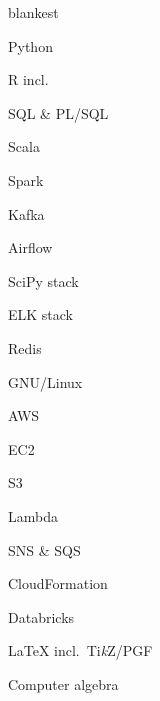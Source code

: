 \documentclass[%
version=last,%
fontsize=11pt,%
paper=A4,%
areasetadvanced,%
headinclude=false,%
footinclude=false,%
headlines=0,%
footlines=0,%
toc=bibnumbered,%
]{scrartcl}
\begin{document}
\begin{minipage}[t]{.4\textwidth}
  \begin{UniformTCBRaster}{2}
    \begin{tcboxedraster}[raster columns=1]{blankest}
      \begin{TCBUnlabeledItems}
      \item Python
      \item R incl.\ 
      \item SQL \& PL/SQL
      \item Scala
      \end{TCBUnlabeledItems}
      \begin{tcolorbox}
        \begin{minipage}[t]{.5\linewidth}
          \begin{UnlabeledItems}
          \item Spark
          \item Kafka
          \item Airflow
          \end{UnlabeledItems}
        \end{minipage}%
        \hfill%
        \begin{minipage}[t]{.5\linewidth}
          \begin{UnlabeledItems}
          \item SciPy stack
          \item ELK stack
          \item Redis
          \end{UnlabeledItems}
        \end{minipage}
      \end{tcolorbox}
    \end{tcboxedraster}
    \begin{TCBUnlabeledItems}
    \item GNU/Linux
    \item AWS
      \begin{Items}[labelindent=10pt,labelsep=3pt,leftmargin=*]
      \item EC2
      \item S3
      \item Lambda
      \item SNS \& SQS
      \item CloudFormation
      \end{Items}
    \item Databricks
    \end{TCBUnlabeledItems}
    \begin{tcolorbox}
      \LaTeX{} incl.\ Ti\emph{k}Z/PGF
    \end{tcolorbox}
    \begin{tcolorbox}
      Computer algebra
    \end{tcolorbox}
  \end{UniformTCBRaster}


\end{minipage}
\end{document}
